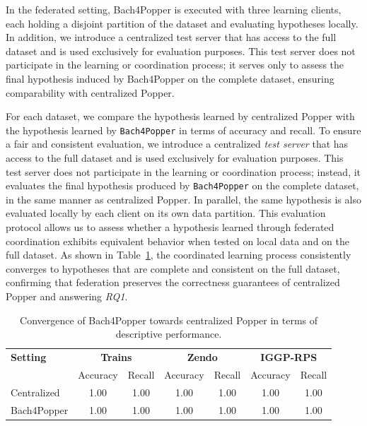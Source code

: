 In the federated setting, Bach4Popper is executed with three learning clients, each holding a disjoint partition of the dataset and evaluating hypotheses locally.
In addition, we introduce a centralized test server that has access to the full dataset and is used exclusively for evaluation purposes.
This test server does not participate in the learning or coordination process; it serves only to assess the final hypothesis induced by Bach4Popper on the complete dataset, ensuring comparability with centralized Popper.

For each dataset, we compare the hypothesis learned by centralized Popper with the hypothesis learned by \texttt{Bach4Popper} in terms of accuracy and recall.
To ensure a fair and consistent evaluation, we introduce a centralized \emph{test server} that has access to the full dataset and is used exclusively for evaluation purposes.
This test server does not participate in the learning or coordination process; instead, it evaluates the final hypothesis produced by \texttt{Bach4Popper} on the complete dataset, in the same manner as centralized Popper.
In parallel, the same hypothesis is also evaluated locally by each client on its own data partition.
This evaluation protocol allows us to assess whether a hypothesis learned through federated coordination exhibits equivalent behavior when tested on local data and on the full dataset.
As shown in Table~\ref{tab:convergence}, the coordinated learning process consistently converges to hypotheses that are complete and consistent on the full dataset, confirming that federation preserves the correctness guarantees of centralized Popper and answering \textit{RQ1}.



\begin{table}[ht]
\centering
\small
\caption{Convergence of Bach4Popper towards centralized Popper in terms of descriptive performance.}
\label{tab:convergence}
\setlength{\tabcolsep}{6pt}
\begin{tabular}{l|cc|cc|cc}
\toprule
\textbf{Setting}
& \multicolumn{2}{c|}{\textbf{Trains}}
& \multicolumn{2}{c|}{\textbf{Zendo}}
& \multicolumn{2}{c}{\textbf{IGGP-RPS}} \\
& Accuracy & Recall
& Accuracy & Recall
& Accuracy & Recall \\
\midrule

Centralized
& 1.00  & 1.00 
& 1.00  & 1.00 
& 1.00  & 1.00   \\

Bach4Popper
& 1.00  & 1.00 
& 1.00  & 1.00 
& 1.00  & 1.00   \\
\bottomrule
\end{tabular}
\end{table}

